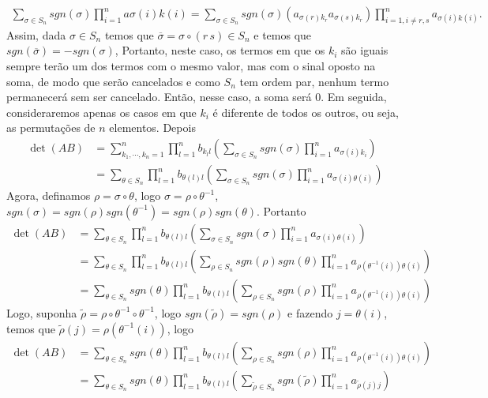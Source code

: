 \begin{homeworkProblem}
\begin{solution}
\begin{align*}
  \sum_{\sigma\in S_n}sgn(\sigma)\prod_{i=1}^{n}a\sigma(i)k(i)=  \sum_{\sigma\in S_n}sgn(\sigma)(a_{\sigma(r)k_r}a_{\sigma(s)k_r})\prod_{i=1,i\neq r,s}^{n}a_{\sigma(i)k(i)}.
\end{align*}
Assim, dada $\sigma\in S_n$ temos que $\overline{\sigma}=\sigma\circ (r\,s)\in S_n$ e temos que $sgn(\overline{\sigma})=-sgn(\sigma)$, Portanto, neste caso, os termos em que os $k_i$ são iguais sempre terão um dos termos com o mesmo valor, mas com o sinal oposto na soma, de modo que serão cancelados e como $S_n$ tem ordem par, nenhum termo permanecerá sem ser cancelado. Então, nesse caso, a soma será $0$. Em seguida, consideraremos apenas os casos em que $k_i$ é diferente de todos os outros, ou seja, as permutações de $n$ elementos. Depois
\begin{align*}
  \det(AB)&=\sum_{k_1,\cdots,k_n=1}^{n}\prod_{l=1}^{n}b_{k_{l}l}\left(\sum_{\sigma\in S_{n}}sgn(\sigma)\prod_{i=1}^{n}a_{\sigma(i)k_{i}}\right)\\
    &=\sum_{\theta\in S_n}\prod_{l=1}^{n}b_{\theta(l)l}\left(\sum_{\sigma\in S_{n}}sgn(\sigma)\prod_{i=1}^{n}a_{\sigma(i)\theta(i)}\right)
\end{align*}
Agora, definamos $\rho=\sigma\circ\theta$, logo $\sigma=\rho\circ\theta^{-1}$, $sgn(\sigma)=sgn(\rho)sgn(\theta^{-1})=sgn(\rho)sgn(\theta)$. Portanto
\begin{align*}
  \det(AB)&=\sum_{\theta\in S_n}\prod_{l=1}^{n}b_{\theta(l)l}\left(\sum_{\sigma\in S_{n}}sgn(\sigma)\prod_{i=1}^{n}a_{\sigma(i)\theta(i)}\right)\\
  &=\sum_{\theta\in S_n}\prod_{l=1}^{n}b_{\theta(l)l}\left(\sum_{\rho\in S_{n}}sgn(\rho)sgn(\theta)\prod_{i=1}^{n}a_{\rho(\theta^{-1}(i))\theta(i)}\right)\\
  &=\sum_{\theta\in S_n}sgn(\theta)\prod_{l=1}^{n}b_{\theta(l)l}\left(\sum_{\rho\in S_{n}}sgn(\rho)\prod_{i=1}^{n}a_{\rho(\theta^{-1}(i))\theta(i)}\right)
\end{align*}
Logo, suponha $\tilde{\rho}=\rho\circ \theta^{-1}\circ\theta^{-1}$, logo $sgn(\tilde{\rho})=sgn(\rho)$ e fazendo $j=\theta(i)$, temos que $\tilde{\rho}(j)=\rho(\theta^{-1}(i))$, logo 
\begin{align*}
  \det(AB)&=\sum_{\theta\in S_n}sgn(\theta)\prod_{l=1}^{n}b_{\theta(l)l}\left(\sum_{\rho\in S_{n}}sgn(\rho)\prod_{i=1}^{n}a_{\rho(\theta^{-1}(i))\theta(i)}\right)\\
  &=\sum_{\theta\in S_n}sgn(\theta)\prod_{l=1}^{n}b_{\theta(l)l}\left(\sum_{\tilde{\rho}\in S_{n}}sgn(\tilde{\rho})\prod_{i=1}^{n}a_{\tilde{\rho}(j)j}\right)

\end{align*}
\end{solution}
\end{homeworkProblem}
